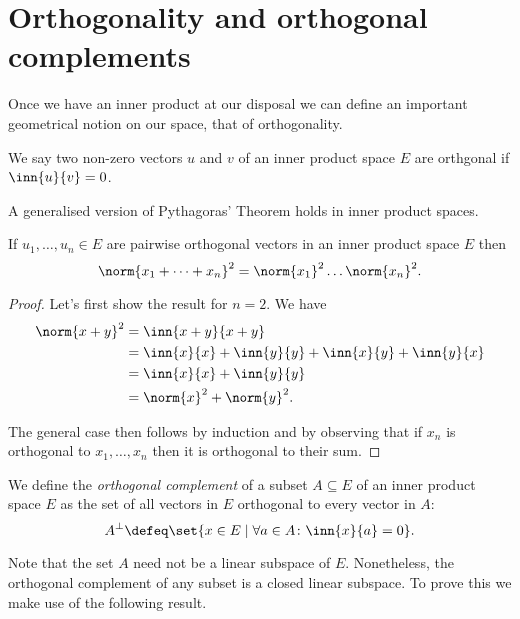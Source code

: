\documentclass[12pt,oneside]{book}
\begin{document}
\section{Orthogonality and orthogonal complements}
Once we have an inner product at our disposal we can define an important geometrical
notion on our space, that of orthogonality.

\begin{definition}[Orhtogonality]
	We say two non-zero vectors \( u \) and \( v \) of an inner product space \( E \) are
	orthgonal if \( \inn{u}{v} = 0 \).
\end{definition}

A generalised version of Pythagoras' Theorem holds in inner product spaces.
\begin{theorem}[Pythagoras]
	If \( u_1, \dots , u_n \in E \) are pairwise orthogonal vectors in an inner product
	space \( E \) then
	\begin{equation*}
		\norm{x_1 + \dots + x_n}^2 = \norm{x_1}^2 \dots \norm{x_n}^2.
	\end{equation*}
\end{theorem}
\begin{proof}
	Let's first show the result for \( n = 2 \). We have
	\begin{align*}
		\norm{x+y}^2 & = \inn{x+y}{x+y} \\
								 & = \inn{x}{x} + \inn{y}{y} + \inn{x}{y} + \inn{y}{x} \\
								 & = \inn{x}{x} + \inn{y}{y} \\
								 & = \norm{x}^2 + \norm{y}^2.
	\end{align*}
	
	The general case then follows by induction and by observing that if \( x_n \) is
	orthogonal to \( x_1, \dots, x_n \) then it is orthogonal to their sum.
\end{proof}

\parbreak

\begin{definition}
	We define the \emph{orthogonal complement} of a subset \( A \subseteq E \) of an inner
	product space \( E \) as the set of all vectors in \( E \) orthogonal to every vector in
	\( A \):
	\begin{equation*}
		A^\perp \defeq \set{x \in E \mid \forall a \in A \colon \inn{x}{a} = 0}.
	\end{equation*}
\end{definition}
Note that the set \( A \) need not be a linear subspace of \( E \). Nonetheless, the
orthogonal complement of any subset is a closed linear subspace. To prove this we make use
of the following result.
\end{document}
